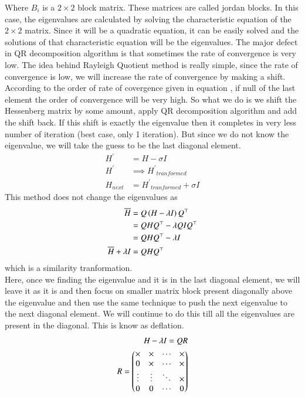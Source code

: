 \documentclass[journal]{IEEEtran}
\begin{document}
Where $B_i$ is a $2 \times 2$ block matrix. These matrices are called jordan blocks. In this case, the eigenvalues are calculated by solving the characteristic equation of the $2 \times 2$ matrix. Since it will be a quadratic equation, it can be easily solved and the solutions of that characteristic equation will be the eigenvalues.\newline
The major defect in QR decomposition algorithm is that sometimes the rate of convergence is very low. The idea behind Rayleigh Quotient method is really simple, since the rate of convergence is low, we will increase the rate of convergence by making a shift. According to the order of rate of covergence given in equation , if null of the last element  the order of convergence will be very high. So what we do is we shift the Hessenberg matrix by some amount, apply QR decomposition algorithm and add the shift back. If this shift is exactly the eigenvalue then it completes in very less number of iteration (best case, only 1 iteration). But since we do not know the eigenvalue, we will take the guess to be the last diagonal element.
\begin{align}
	H^\prime &= H - \sigma I\\
	H^\prime &\implies {H^\prime}_{tranformed}\\
	H_{next} &= {H^\prime}_{tranformed} + \sigma I
\end{align}
This method does not change the eigenvalues as
\begin{align}
\overline{H} &= Q\left(H - \lambda I\right)Q^\top\\
	&= QHQ^\top - \lambda QIQ^\top\\
	&= QHQ^\top - \lambda I\\
\overline{H} +\lambda I &= QHQ^\top
\end{align}
which is a similarity tranformation.\\
Here, once we finding the eigenvalue and it is in the last diagonal element, we will leave it as it is and then focus on smaller matrix block present diagonally above the eigenvalue and then use the same technique to push the next eigenvalue to the next diagonal element. We will continue to do this till all the eigenvalues are present in the diagonal. This is know as deflation.
\begin{align}
H  - \lambda I = QR\\
R = \begin{pmatrix}\times & \times & \cdots & \times\\
	0 & \times & \cdots & \times\\
	\vdots & \vdots & \ddots & \times\\
	0 & 0 & \cdots & 0\end{pmatrix}
\end{align}
\end{document}

